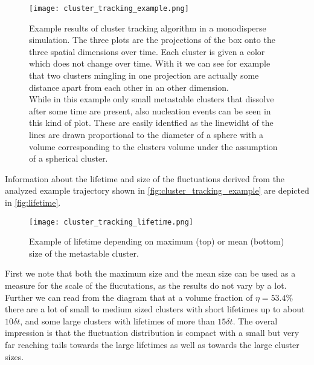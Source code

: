 \begin{figure}[h]
\centering
\texttt{[image: cluster\_tracking\_example.png]}
\caption[Individual cluster tracking example]{Example results of cluster tracking algorithm in a monodisperse simulation. The three plots are the projections of the box onto the three spatial dimensions over time. Each cluster is given a color which does not change over time. With it we can see for example that two clusters mingling in one projection are actually some distance apart from each other in an other dimension.\\
While in this example only small metastable clusters that dissolve after some time are present, also nucleation events can be seen in this kind of plot. These are easily identfied as the linewidht of the lines are drawn proportional to the diameter of a sphere with a volume corresponding to the clusters volume under the assumption of a spherical cluster.}
\label{fig:cluster_tracking_example}
\end{figure}

Information about the lifetime and size of the fluctuations derived from the analyzed example trajectory shown in \autoref{fig:cluster_tracking_example} are depicted in \autoref{fig:lifetime}.
\begin{figure}[h]
\centering
\texttt{[image: cluster\_tracking\_lifetime.png]}
\caption[Size depending on lifetime of clusters example]{Example of lifetime depending on  maximum (top) or mean (bottom) size of the metastable cluster. }
\label{fig:lifetime}
\end{figure}
First we note that both the maximum size and the mean size can be used as a measure for the scale of the flucutations, as the results do not vary by a lot. Further we can read from the diagram that at a volume fraction of $\eta = 53.4\%$ there are a lot of small to medium sized clusters with short lifetimes up to about $10 \delta t$, and some large clusters with lifetimes of more than $15 \delta t$. The overal impression is that the fluctuation distribution is compact with a small but very far reaching tails towards the large lifetimes as well as towards the large cluster sizes.
